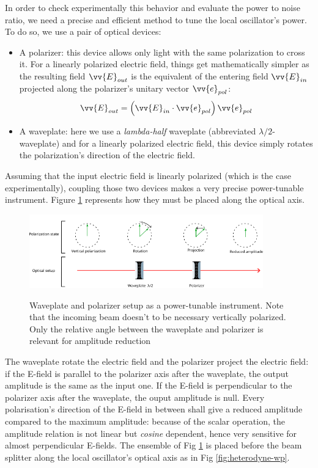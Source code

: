 \documentclass[11pt]{report}
\begin{document}
In order to check experimentally this behavior and evaluate the power to noise ratio, we need a precise and efficient method to tune the local oscillator's power. To do so, we use a pair of optical devices:
\begin{itemize}
	\item A polarizer: this device allows only light with the same polarization to cross it. For a linearly polarized electric field, things get mathematically simpler as the resulting field $\vv{E}_{out}$ is the equivalent of the entering field $\vv{E}_{in}$ projected along the polarizer's unitary vector $\vv{e}_{pol}$:
	\begin{equation}
	\vv{E}_{out} = \left( \vv{E}_{in} \cdot \vv{e}_{pol} \right) \vv{e}_{pol}
	\end{equation}
	\item A waveplate: here we use a \textit{lambda-half} waveplate (abbreviated $\lambda/2$-waveplate) and for a linearly polarized electric field, this device simply rotates the polarization's direction of the electric field.  
\end{itemize}

Assuming that the input electric field is linearly polarized (which is the case experimentally), coupling those two devices makes a very precise power-tunable instrument. Figure \ref{fig:wp-pol-setup} represents how they must be placed along the optical axis.

\begin{figure}[h!]
\caption{Waveplate and polarizer setup as a power-tunable instrument. Note that the incoming beam doesn't to be necessary vertically polarized. Only the relative angle between the waveplate and polarizer is relevant for amplitude reduction}
\centering
\includegraphics[width=0.9\textwidth]{wp-pol-setup}
\label{fig:wp-pol-setup}
\end{figure}

The waveplate rotate the electric field and the polarizer project the electric field: if the E-field is parallel to the polarizer axis after the waveplate, the output amplitude is the same as the input one. If the E-field is perpendicular to the polarizer axis after the waveplate, the ouput amplitude is null. Every polarisation's direction of the E-field in between shall give a reduced amplitude compared to the maximum amplitude: because of the scalar operation, the amplitude relation is not linear but \textit{cosine} dependent, hence very sensitive for almost perpendicular E-fields. The ensemble of Fig \ref{fig:wp-pol-setup} is placed before the beam splitter along the local oscillator's optical axis as in Fig \ref{fig:heterodyne-wp}.
\end{document}
